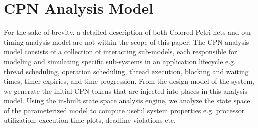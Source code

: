 \section{CPN Analysis Model}
\label{sec:CPN}


For the sake of brevity, a detailed description of both Colored Petri nets and our timing analysis model are not within the scope of this paper. The CPN analysis model consists of a collection of interacting sub-models, each responsible for modeling and simulating specific sub-systems in an application lifecycle e.g. thread scheduling, operation scheduling, thread execution, blocking and waiting times, timer expiries, and time progression. From the design model of the system, we generate the initial CPN tokens that are injected into places in this analysis model. Using the in-built state space analysis engine, we analyze the state space of the parameterized model to compute useful system properties \cite{kumar2014colored} \cite{SEUS} e.g. processor utilization, execution time plots, deadline violations etc.   




